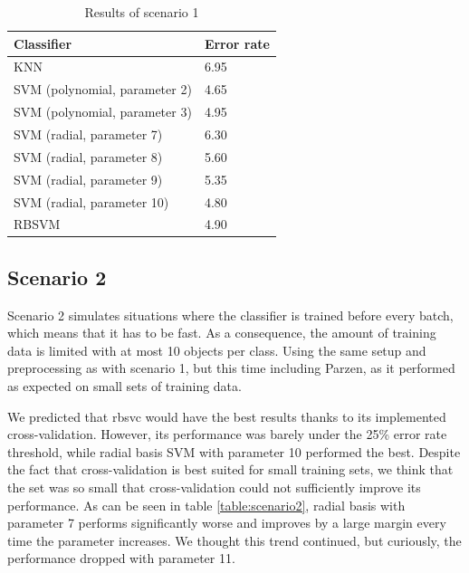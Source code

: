 \documentclass[11pt,twoside,a4paper]{article}
\begin{document}
\begin{table}[h]
\centering
    \begin{tabular}{ll}
    Classifier                    & Error rate \\ \hline
    KNN                           & 6.95       \\
    SVM (polynomial, parameter 2) & 4.65       \\
    SVM (polynomial, parameter 3) & 4.95       \\
    SVM (radial, parameter 7)     & 6.30       \\
    SVM (radial, parameter 8)     & 5.60       \\
    SVM (radial, parameter 9)     & 5.35       \\
    SVM (radial, parameter 10)    & 4.80       \\
    RBSVM                         & 4.90       \\
    \end{tabular}
    \caption{Results of scenario 1}
    \label{table:scenario1}
\end{table}


\subsection{Scenario 2}
Scenario 2 simulates situations where the classifier is trained before every batch, which means that it has to be fast. As a consequence, the amount of training data is limited with at most 10 objects per class. Using the same setup and preprocessing as with scenario 1, but this time including Parzen, as it performed as expected on small sets of training data. 

We predicted that rbsvc would have the best results thanks to its implemented cross-validation. However, its performance was barely under the 25\% error rate threshold, while radial basis SVM with parameter 10 performed the best. Despite the fact that cross-validation is best suited for small training sets, we think that the set was so small that cross-validation could not sufficiently improve its performance. As can be seen in table \ref{table:scenario2}, radial basis with parameter 7 performs significantly worse and improves by a large margin every time the parameter increases. We thought this trend continued, but curiously, the performance dropped with parameter 11.
\end{document}
